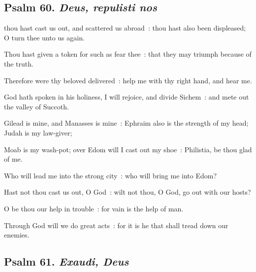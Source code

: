 \subsection{Psalm 60. \textit{Deus, repulisti nos}}


 thou hast cast us out, and scattered us abroad~: thou hast also been displeased; O turn thee unto us again.\par
{}
Thou hast given a token for such as fear thee~: that they may triumph because of the truth.\par
{}Therefore were thy beloved delivered~: help me with thy right hand, and hear me.\par
{}God hath spoken in his holiness, I will rejoice, and divide Sichem~: and mete out the valley of Succoth.\par
{}Gilead is mine, and Manasses is mine~: Ephraim also is the strength of my head; Judah is my law-giver;\par
{}Moab is my wash-pot; over Edom will I cast out my shoe~: Philistia, be thou glad of me.\par
{}Who will lead me into the strong city~: who will bring me into Edom?\par
{}Hast not thou cast us out, O God~: wilt not thou, O God, go out with our hosts?\par
{}O be thou our help in trouble~: for vain is the help of man.\par
{}Through God will we do great acts~: for it is he that shall tread down our enemies.\par

\subsection{Psalm 61. \textit{Exaudi, Deus}}


